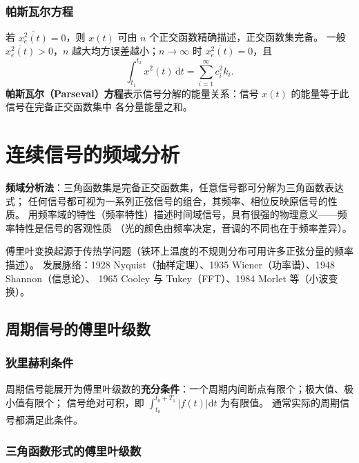 \subsubsection{帕斯瓦尔方程}

若 $\overline{x_e^2(t)}=0$，则 $x(t)$ 可由 $n$ 个正交函数精确描述，正交函数集完备。
一般 $\overline{x_e^2(t)}>0$，$n$ 越大均方误差越小；$n\to\infty$ 时 $\overline{x_e^2(t)}=0$，且
\begin{equation}
\int_{t_1}^{t_2}x^2(t)\,\mathrm{d}t=\sum_{i=1}^{\infty}c_i^2k_i .
\end{equation}
\textbf{帕斯瓦尔（Parseval）方程}表示信号分解的能量关系：信号 $x(t)$ 的能量等于此信号在完备正交函数集中
各分量能量之和。

\section{连续信号的频域分析}

\textbf{频域分析法}：三角函数集是完备正交函数集，任意信号都可分解为三角函数表达式；
任何信号都可视为一系列正弦信号的组合，其频率、相位反映原信号的性质。
用频率域的特性（频率特性）描述时间域信号，具有很强的物理意义——频率特性是信号的客观性质
（光的颜色由频率决定，音调的不同也在于频率差异）。

傅里叶变换起源于传热学问题（铁环上温度的不规则分布可用许多正弦分量的频率描述）。
发展脉络：1928 Nyquist（抽样定理）、1935 Wiener（功率谱）、1948 Shannon（信息论）、
1965 Cooley 与 Tukey（FFT）、1984 Morlet 等（小波变换）。

\subsection{周期信号的傅里叶级数}

\subsubsection{狄里赫利条件}

周期信号能展开为傅里叶级数的\textbf{充分条件}：一个周期内间断点有限个；极大值、极小值有限个；
信号绝对可积，即 $\displaystyle\int_{t_0}^{t_0+T_1}|f(t)|\mathrm{d}t$ 为有限值。
通常实际的周期信号都满足此条件。

\subsubsection{三角函数形式的傅里叶级数}

